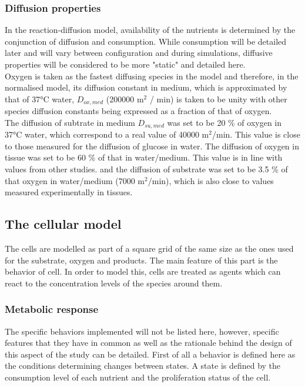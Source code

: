 \documentclass[11pt,a4paper]{article}
\begin{document}
\subsubsection{Diffusion properties}
In the reaction-diffusion model, availability of the nutrients is determined by the conjunction of diffusion and consumption. While consumption will be detailed later and will vary between configuration and during simulations, diffusive properties will be considered to be more "static" and detailed here.\\

Oxygen is taken as the fastest diffusing species in the model and therefore, in the normalised model, its diffusion constant in medium, which is approximated by that of 37°C water, $D_{ox,med}$ (200000 \textmu m$^2$ / min) is taken to be unity with other species diffusion constants being expressed as a fraction of that of oxygen.\\

The diffusion of subtrate in medium $D_{su,med}$ was set to be 20 \% of oxygen in 37°C water, which correspond to a real value of 40000 \textmu m$^2$/min. This value is close to those measured for the diffusion of glucose in water.\cite{Hober1947} The diffusion of oxygen in tissue was set to be 60 \% of that in water/medium. This value is in line with values from other studies.\cite{Mao2018}\cite{Grote1977} and the diffusion of substrate was set to be 3.5 \% of that oxygen in water/medium (7000 \textmu m$^2$/min), which is also close to values measured experimentally in tissues.\cite{Grote1977}\cite{Pfeuffer2000}\\


\subsection{The cellular model}
The cells are modelled as part of a square grid of the same size as the ones used for the substrate, oxygen and products. The main feature of this part is the behavior of cell. In order to model this, cells  are treated as agents which can react to the concentration levels of the species around them.\\

\subsubsection{Metabolic response}
The specific behaviors implemented will not be listed here, however, specific features that they have in common as well as the rationale behind the design of this aspect of the study can be detailed. First of all a behavior is defined here as the conditions determining changes between states. A state is defined by the consumption level of each nutrient and the proliferation status of the cell. \\
\end{document}
